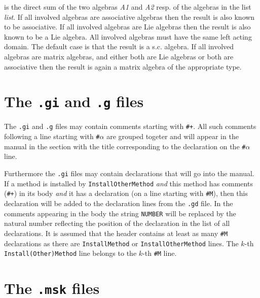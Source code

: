 \documentclass[a4wide]{article}
\begin{document}
\begin{exa}
\noindent is the direct sum of the two algebras {\it A1} and {\it A2} resp. 
of the algebras  in the list {\it list}. 
If all involved algebras are associative algebras then the result is also 
known to be associative. 
If all involved algebras are Lie algebras then the result is also known 
to be a Lie algebra. 
All involved algebras must have the same left acting domain. 
The default case is that the result is a s.c. algebra. 
If all involved algebras are matrix algebras, and either both are Lie 
algebras or both are associative then the result is again a 
matrix algebra of the appropriate type. 
\end{exa}

\section{The {\tt .gi} and {\tt .g} files}

The {\tt .gi} and {\tt .g} files may contain comments starting with {\tt \#+}. 
All such comments following a line starting with {\tt \#}$\alpha$ are grouped 
togeter and will appear in the manual in the section with the title 
corresponding to the declaration on the {\tt \#}$\alpha$ line.\par
Furthermore the {\tt .gi} files may contain declarations that will go into the
manual. If a method is installed by {\tt InstallOtherMethod} {\em and}
this method has comments ({\tt \#+}) in its body {\em and} it has a
declaration (on a line starting with {\tt \#M}), then this declaration
will be added to the declaration lines from the {\tt .gd} file. In the
comments appearing in the body the string {\tt NUMBER} will be replaced 
by the natural number reflecting the position of the declaration in the
list of all declarations. It is assumed that the header contains at least
as many {\tt \#M} declarations as there are {\tt InstallMethod} or
{\tt InstallOtherMethod} lines. The $k$-th {\tt Install(Other)Method} line
belongs to the $k$-th {\tt \#M} line.

\section{The {\tt .msk} files}
\end{document}
